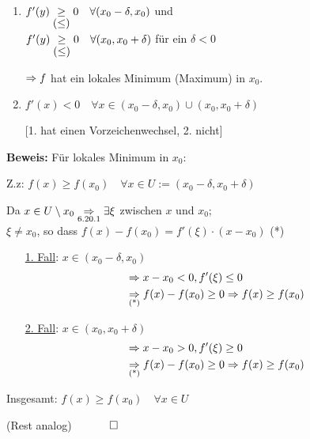 \documentclass[10pt, a4paper, fleqn]{article}
\begin{document}
\begin{enumerate}[1.]
    \item
    $f'(y) \underset{\hbox{$(\leq)$}}{\geq} 0 \quad \forall (x_0 - \delta, x_0)$ und \\
    $f'(y) \underset{\hbox{$(\leq)$}}{\geq} 0 \quad \forall (x_0, x_0 + \delta)$ für ein $\delta < 0$

    $\Rightarrow f$ hat ein lokales Minimum (Maximum) in $x_0$.

    \item
    $f'(x) < 0 \quad \forall x \in (x_0 - \delta, x_0) \cup (x_0, x_0 + \delta)$

    [1. hat einen Vorzeichenwechsel, 2. nicht]
\end{enumerate}

\textbf{Beweis: } Für lokales Minimum in $x_0$:

Z.z: $f(x) \geq f(x_0) \quad \forall x \in U := (x_0 - \delta , x_0 + \delta)$

Da $x \in U \setminus {x_0} \underset{6.20.1}{\Rightarrow} \exists \xi$ zwischen $x$ und $x_0$; \\
$\xi \neq x_0$, so dass $f(x) - f(x_0) = f'(\xi) \cdot (x - x_0)$ (*)

\begin{enumerate}
    \addtolength{\itemindent}{12pt}
    \item[\underline{1. Fall}: ] $x \in (x_0 - \delta, x_0)$
    \[\begin{aligned}
        &\Rightarrow x - x_0 < 0, f'(\xi) \leq 0 \\
        &\underset{\text{(*)}}{\Rightarrow} f(x) - f(x_0) \geq 0
        \Rightarrow f(x) \geq f(x_0)    
    \end{aligned}\]
    \item[\underline{2. Fall}: ] $x \in (x_0, x_0 + \delta)$
    \[\begin{aligned}
        &\Rightarrow x - x_0 > 0, f'(\xi) \geq 0 \\
        &\underset{\text{(*)}}{\Rightarrow} f(x) - f(x_0) \geq 0
        \Rightarrow f(x) \geq f(x_0)    
    \end{aligned}\]
\end{enumerate}
Insgesamt: $f(x) \geq f(x_0) \quad \forall x \in U$

(Rest analog) $\quad \qed$
\end{document}
